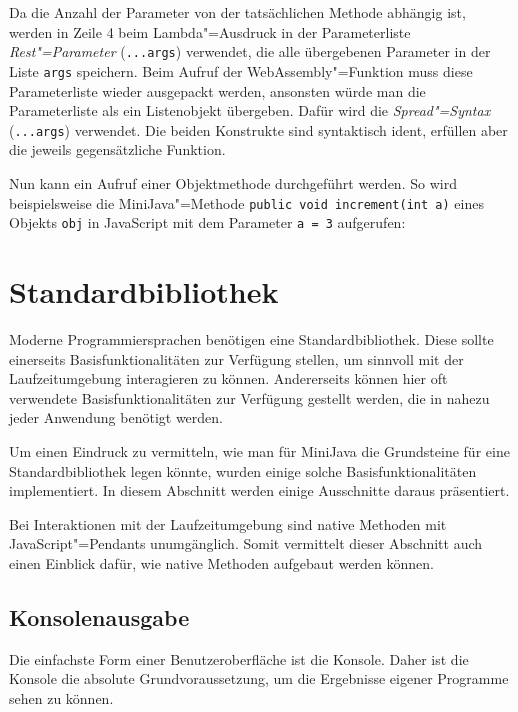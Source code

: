 

Da die Anzahl der Parameter von der tatsächlichen Methode abhängig ist, werden in Zeile 4 beim Lambda"=Ausdruck in der Parameterliste \emph{Rest"=Parameter} (\lstinline{...args}) \cite{MDNJavaScript} verwendet, die alle übergebenen Parameter in der Liste \lstinline{args} speichern. Beim Aufruf der WebAssembly"=Funktion muss diese Parameterliste wieder ausgepackt werden, ansonsten würde man die Parameterliste als ein Listenobjekt übergeben. Dafür wird die \emph{Spread"=Syntax} (\lstinline{...args}) verwendet. Die beiden Konstrukte sind syntaktisch ident, erfüllen aber die jeweils gegensätzliche Funktion.

Nun kann ein Aufruf einer Objektmethode durchgeführt werden. So wird beispielsweise die MiniJava"=Methode \lstinline{public void increment(int a)} eines Objekts \lstinline{obj} in JavaScript mit dem Parameter \lstinline{a = 3} aufgerufen:



\section{Standardbibliothek}
\label{sec:Standardbibliothek}

Moderne Programmiersprachen benötigen eine Standardbibliothek. Diese sollte einerseits Basisfunktionalitäten zur Verfügung stellen, um sinnvoll mit der Laufzeitumgebung interagieren zu können. Andererseits können hier oft verwendete Basisfunktionalitäten zur Verfügung gestellt werden, die in nahezu jeder Anwendung benötigt werden.

Um einen Eindruck zu vermitteln, wie man für MiniJava die Grundsteine für eine Standardbibliothek legen könnte, wurden einige solche Basisfunktionalitäten implementiert. In diesem Abschnitt werden einige Ausschnitte daraus präsentiert.

Bei Interaktionen mit der Laufzeitumgebung sind native Methoden mit JavaScript"=Pendants unumgänglich. Somit vermittelt dieser Abschnitt auch einen Einblick dafür, wie native Methoden aufgebaut werden können.

\subsection{Konsolenausgabe}
Die einfachste Form einer Benutzeroberfläche ist die Konsole. Daher ist die Konsole die absolute Grundvoraussetzung, um die Ergebnisse eigener Programme sehen zu können.

